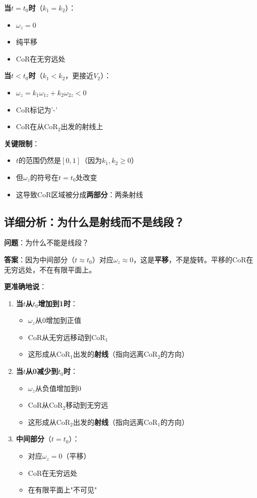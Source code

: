 \documentclass[12pt,a4paper]{article}
\begin{document}
\textbf{当$t = t_0$时}（$k_1 = k_2$）：
\begin{itemize}
\item $\omega_z = 0$
\item 纯平移
\item CoR在无穷远处
\end{itemize}

\textbf{当$t < t_0$时}（$k_1 < k_2$，更接近$V_2$）：
\begin{itemize}
\item $\omega_z = k_1 \omega_{1z} + k_2 \omega_{2z} < 0$
\item CoR标记为'-'
\item CoR在从CoR$_2$出发的射线上
\end{itemize}

\textbf{关键限制}：
\begin{itemize}
\item $t$的范围仍然是$[0, 1]$（因为$k_1, k_2 \geq 0$）
\item 但$\omega_z$的符号在$t = t_0$处改变
\item 这导致CoR区域被分成\textbf{两部分}：两条射线
\end{itemize}

\subsection{详细分析：为什么是射线而不是线段？}

\textbf{问题}：为什么不能是线段？

\textbf{答案}：因为中间部分（$t \approx t_0$）对应$\omega_z \approx 0$，这是\textbf{平移}，不是旋转。平移的CoR在无穷远处，不在有限平面上。

\textbf{更准确地说}：

\begin{enumerate}
\item \textbf{当$t$从$t_0$增加到1时}：
   \begin{itemize}
   \item $\omega_z$从0增加到正值
   \item CoR从无穷远移动到CoR$_1$
   \item 这形成从CoR$_1$出发的\textbf{射线}（指向远离CoR$_2$的方向）
   \end{itemize}

\item \textbf{当$t$从0减少到$t_0$时}：
   \begin{itemize}
   \item $\omega_z$从负值增加到0
   \item CoR从CoR$_2$移动到无穷远
   \item 这形成从CoR$_2$出发的\textbf{射线}（指向远离CoR$_1$的方向）
   \end{itemize}

\item \textbf{中间部分}（$t = t_0$）：
   \begin{itemize}
   \item 对应$\omega_z = 0$（平移）
   \item CoR在无穷远处
   \item 在有限平面上"不可见"
   \end{itemize}
\end{enumerate}
\end{document}
